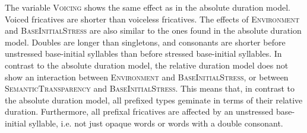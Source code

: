     \begin{table}[h!]
    	\caption{ Summary of linear model for variables predicting the relative  duration of [s] in prefixed words}
    	\label{tbl: summary model5}
    	\begin{center}
    	\end{center}
    \end{table}
  
The variable \textsc{Voicing} shows the same effect as in the absolute duration model. Voiced fricatives are shorter than voiceless fricatives.
The effects of \textsc{Environment} and \textsc{BaseInitialStress} are also similar to the ones found in the absolute duration model. Doubles are longer than singletons, and consonants are shorter before unstressed base-initial syllables than before stressed base-initial syllables. 
In contrast to the absolute duration model, the relative duration model does not show an interaction between \textsc{Environment} and \textsc{BaseInitialStress}, or between \textsc{SemanticTransparency} and \textsc{BaseInitialStress}. This means that, in contrast to the absolute duration model,  all prefixed types geminate in terms of their relative duration. Furthermore, all prefixal fricatives are affected by an unstressed base-initial syllable, i.e. not just opaque words or words with a double consonant.

